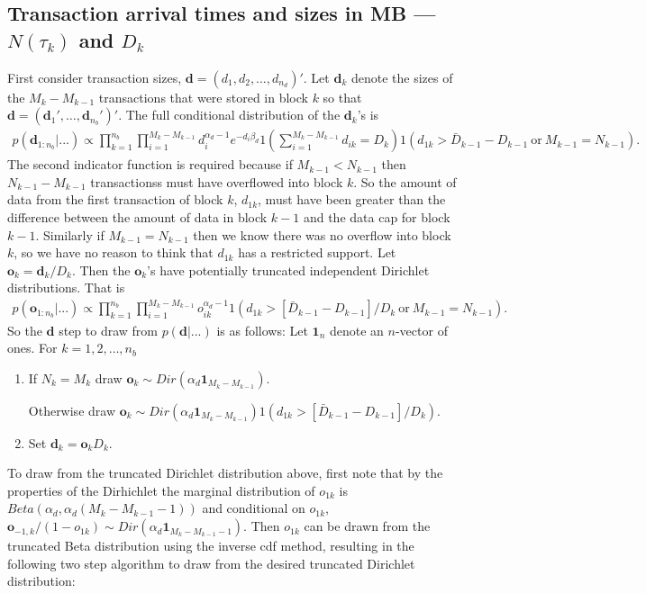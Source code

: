 \documentclass{article}
\begin{document}
\subsection{Transaction arrival times and sizes in MB --- $N(\tau_k)$ and $D_k$}
First consider transaction sizes, $\bm{d}=(d_1,d_2,\dots,d_{n_d})'$. Let $\bm{d}_k$ denote the sizes of the $M_k - M_{k-1}$ transactions that were stored in block $k$ so that $\bm{d} = (\bm{d}_1',\dots,\bm{d}_{n_{b}}')'$. The full conditional distribution of the $\bm{d}_k$'s is
\begin{align*}
p(\bm{d}_{1:n_{b}}|...)\propto \prod_{k=1}^{n_b}\prod_{i=1}^{M_k - M_{k-1}} d_i^{\alpha_d - 1}e^{-d_i\beta_d}1\left(\sum_{i=1}^{M_k - M_{k-1}} d_{ik}= D_k\right)1\left(d_{1k} > \bar{D}_{k-1} - D_{k-1} \mathrm{\ or\ } M_{k-1} = N_{k-1}\right).
\end{align*}
The second indicator function is required because if $M_{k-1} < N_{k-1}$ then $N_{k-1} - M_{k-1}$ transactionss must have overflowed into block $k$. So the amount of data from the first transaction of block $k$, $d_{1k}$, must have been greater than the difference between the amount of data in block $k-1$ and the data cap for block $k-1$. Similarly if $M_{k-1} = N_{k-1}$ then we know there was no overflow into block $k$, so we have no reason to think that $d_{1k}$ has a restricted support. Let $\bm{o}_k = \bm{d}_k/D_k$. Then the $\bm{o}_k$'s have potentially truncated independent Dirichlet distributions. That is
\begin{align*}
p(\bm{o}_{1:n_b}|...)\propto \prod_{k=1}^{n_b} \prod_{i=1}^{M_k - M_{k-1}}o_{ik}^{\alpha_d - 1} 1\left(d_{1k} > [\bar{D}_{k-1} - D_{k-1}]/D_{k} \mathrm{\ or\ } M_{k-1} = N_{k-1}\right).
\end{align*}
So the $\bm{d}$ step to draw from $p(\bm{d}|...)$ is as follows: Let $\bm{1}_n$ denote an $n$-vector of ones. For $k=1,2,\dots,n_b$
\begin{enumerate}
\item If $N_k = M_k$ draw $\bm{o}_{k} \sim Dir(\alpha_d\bm{1}_{M_k - M_{k-1}})$.

  Otherwise draw $\bm{o}_{k} \sim Dir(\alpha_d\bm{1}_{M_k - M_{k-1}})1(d_{1k} > [\bar{D}_{k-1} - D_{k-1}]/D_k)$.
\item Set $\bm{d}_k = \bm{o}_kD_k$.
\end{enumerate}
To draw from the truncated Dirichlet distribution above, first note that by the properties of the Dirhichlet the marginal distribution of $o_{1k}$ is $Beta(\alpha_d, \alpha_d(M_k - M_{k-1} - 1))$ and conditional on $o_{1k}$, $\bm{o}_{-1,k}/(1 - o_{1k}) \sim Dir(\alpha_d\bm{1}_{M_k - M_{k-1} - 1})$. Then $o_{1k}$ can be drawn from the truncated Beta distribution using the inverse cdf method, resulting in the following two step algorithm to draw from the desired truncated Dirichlet distribution:
\end{document}
